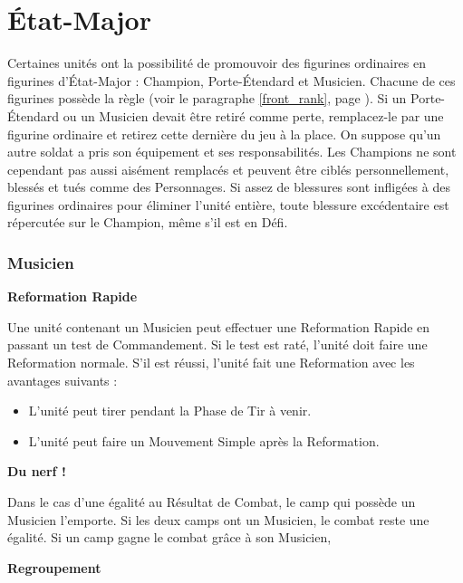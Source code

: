 
\part{État-Major}
\label{command_group}

Certaines unités ont la possibilité de promouvoir des figurines ordinaires en figurines d'État-Major : Champion, Porte-Étendard et Musicien. Chacune de ces figurines possède la règle \newfromWHB{\frontrank} (voir le paragraphe \ref{front_rank}, page \pageref{front_rank}). Si un Porte-Étendard ou un Musicien devait être retiré comme perte, remplacez-le par une figurine ordinaire et retirez cette dernière du jeu à la place. On suppose qu'un autre soldat a pris son équipement et ses responsabilités. Les Champions ne sont cependant pas aussi aisément remplacés et peuvent être ciblés personnellement, blessés et tués comme des Personnages. Si assez de blessures sont infligées à des figurines ordinaires pour éliminer l'unité entière, toute blessure excédentaire est répercutée sur le Champion, même s'il est en Défi.

\section{Musicien}
\label{musician}

\noindent\textbf{Reformation Rapide}

Une unité contenant un Musicien peut effectuer une Reformation Rapide en passant un test de Commandement. Si le test est raté, l'unité doit faire une Reformation normale. S'il est réussi, l'unité fait une Reformation avec les avantages suivants :
\begin{itemize}[label={-}]
\item L'unité peut tirer pendant la Phase de Tir à venir.
\item L'unité peut faire un Mouvement Simple après la Reformation.
\end{itemize}

\noindent\textbf{Du nerf !}

Dans le cas d'une égalité au Résultat de Combat, le camp qui possède un Musicien l'emporte. Si les deux camps ont un Musicien, le combat reste une égalité. Si un camp gagne le combat grâce à son Musicien, 

\noindent\textbf{Regroupement}

